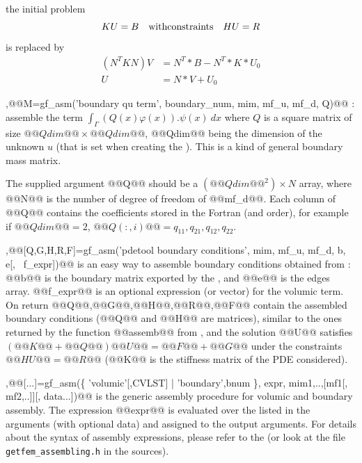 \begin{cmddescription}
the initial problem\\
   \begin{equation*}
     KU = B \quad\text{with constraints}\quad HU=R\\
   \end{equation*}
   is replaced by
   \begin{equation*}
     \begin{array}{ll}
       (N^TKN)V &= N^T*B - N^T*K*U_0\\
       U &= N*V + U_0
     \end{array}
   \end{equation*}

   \sep{@@M=gf\_asm('boundary qu term', boundary\_num, mim, mf\_u, mf\_d,
     Q)@@} :  assemble the term $\int_{\Gamma}
   (Q(x)\varphi(x)).\psi(x)~dx$ where $Q$ is a square matrix of size $@@Qdim@@\times
   @@Qdim@@$, @@Qdim@@ being the dimension of the unknown $u$ (that is
   set when creating the \tmf). This is a kind of general boundary
   mass matrix.
  
  The supplied argument @@Q@@ should be a $(@@Qdim@@^2)\times N$
  array, where @@N@@ is the number of degree of freedom of @@mf\_d@@.
  Each column of @@Q@@ contains the coefficients stored in the Fortran
  (and \mlab order), for example if $@@Qdim@@ =2$, $@@Q(:,i)@@ =
  q_{11}, q_{21}, q_{12}, q_{22}$.
  
  \sep{@@[Q,G,H,R,F]=gf\_asm('pdetool boundary conditions', mim, mf\_u,
    mf\_d, b, e[, \tstr\ f\_expr])@@}  is an easy way to assemble boundary conditions
  obtained from \pdetool: @@b@@ is the boundary matrix exported by the
  \pdetool, and @@e@@ is the edges array.  @@f\_expr@@ is an optional
  expression (or vector) for the volumic term. On return
  @@Q@@,@@G@@,@@H@@,@@R@@,@@F@@ contain the assembled boundary
  conditions (@@Q@@ and @@H@@ are matrices), similar to the ones
  returned by the function @@assemb@@ from \pdetool, and the solution
  @@U@@ satisfies $(@@K@@+@@Q@@)@@U@@=@@F@@+@@G@@$ under the
  constraints $@@HU@@=@@R@@$ (@@K@@ is the stiffness matrix of the PDE
  considered).
  
  \sep{@@[...]=gf_asm(\{ 'volumic'[,CVLST] | 'boundary',bnum \}, expr,
  mim1,..,[mf1[, mf2,..]][, data...])@@} is the generic assembly procedure for
  volumic and boundary assembly. The expression @@expr@@ is evaluated
  over the \tmf listed in the arguments (with optional data) and
  assigned to the output arguments. For details about the syntax of
  assembly expressions, please refer to the
   (or look at the file \texttt{getfem\_assembling.h} in the
  \gf sources).
  

\end{cmddescription}
